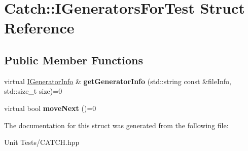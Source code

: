 \hypertarget{structCatch_1_1IGeneratorsForTest}{}\section{Catch\+:\+:I\+Generators\+For\+Test Struct Reference}
\label{structCatch_1_1IGeneratorsForTest}
\subsection*{Public Member Functions}
\begin{DoxyCompactItemize}
\item 
virtual \hyperlink{structCatch_1_1IGeneratorInfo}{I\+Generator\+Info} \& {\bfseries get\+Generator\+Info} (std\+::string const \&file\+Info, std\+::size\+\_\+t size)=0\hypertarget{structCatch_1_1IGeneratorsForTest_a180d84e858840188e4c3788e47eefdb0}{}\label{structCatch_1_1IGeneratorsForTest_a180d84e858840188e4c3788e47eefdb0}

\item 
virtual bool {\bfseries move\+Next} ()=0\hypertarget{structCatch_1_1IGeneratorsForTest_adab31832d529fc584fd63164e0a1c8ad}{}\label{structCatch_1_1IGeneratorsForTest_adab31832d529fc584fd63164e0a1c8ad}

\end{DoxyCompactItemize}


The documentation for this struct was generated from the following file\+:\begin{DoxyCompactItemize}
\item 
Unit Tests/C\+A\+T\+C\+H.\+hpp\end{DoxyCompactItemize}
